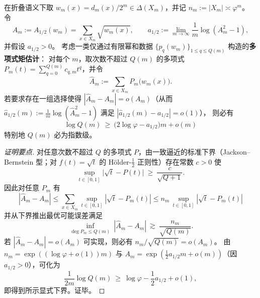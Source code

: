 \begin{proposition}\label{prop:pom-half-exponent-explicit-moment-order-lb}
在折叠语义下取 \(w_m(x)=d_m(x)/2^m\in\Delta(X_m)\)，并记 \(n_m:=|X_m|\asymp \varphi^{m}\)。
令
\[
A_m:=A_{1/2}(w_m)=\sum_{x\in X_m}\sqrt{w_m(x)},
\qquad
a_{1/2}:=\lim_{m\to\infty}\frac{1}{m}\log(A_m^2-1),
\]
并假设 \(a_{1/2}>0\)。
考虑一类仅通过有限幂和数据 \(\{p_q(w_m)\}_{1\le q\le Q(m)}\) 构造的\textbf{多项式矩估计}：
对每个 \(m\)，取次数不超过 \(Q(m)\) 的多项式 \(P_m(t)=\sum_{q=0}^{Q(m)}c_{q,m}t^q\)，并令
\[
\widehat A_m:=\sum_{x\in X_m}P_m\!\bigl(w_m(x)\bigr).
\]
若要求存在一组选择使得 \(|\widehat A_m-A_m|=o(A_m)\)（从而 \(\widehat a_{1/2}(m):=\frac1m\log(\widehat A_m^2-1)\) 满足 \(|\widehat a_{1/2}(m)-a_{1/2}|=o(1)\)），
则必有
\[
\boxed{\;
\log Q(m)\ \ge\ \bigl(2\log\varphi-a_{1/2}\bigr)m+o(m)\;}
\]
特别地 \(Q(m)\) 必为指数级。
\end{proposition}
\begin{proof}[证明要点]
对任意次数不超过 \(Q\) 的多项式 \(P\)，由一致逼近的标准下界（Jackson--Bernstein 型；对 \(f(t)=\sqrt{t}\) 的 Hölder-\(\tfrac12\) 正则性）存在常数 \(c>0\) 使
\[
\sup_{t\in[0,1]}\bigl|\sqrt{t}-P(t)\bigr|\ \ge\ \frac{c}{\sqrt{Q+1}}.
\]
因此对任意 \(P_m\) 有
\[
|\widehat A_m-A_m|
\le
\sum_{x\in X_m}\sup_{t\in[0,1]}|\sqrt t-P_m(t)|
\le
n_m\,\sup_{t\in[0,1]}|\sqrt t-P_m(t)|
\]
并从下界推出最优可能误差满足
\[
\inf_{\deg P_m\le Q(m)}\ |\widehat A_m-A_m|\ \gtrsim\ \frac{n_m}{\sqrt{Q(m)}}.
\]
若 \(|\widehat A_m-A_m|=o(A_m)\) 可实现，则必有 \(n_m/\sqrt{Q(m)}=o(A_m)\)。
由 \(n_m=\exp((\log\varphi+o(1))m)\) 与 \(A_m=\exp(\frac12 a_{1/2}m+o(m))\)（因 \(a_{1/2}>0\)），可化为
\[
\frac{1}{2m}\log Q(m)\ \ge\ \log\varphi-\frac12 a_{1/2}+o(1),
\]
即得到所示显式下界。证毕。
\end{proof}

